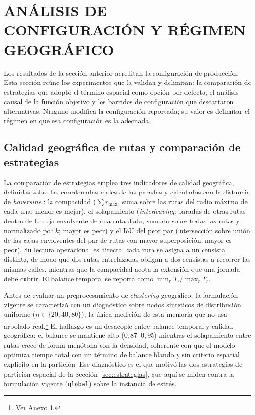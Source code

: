\section{ANÁLISIS DE CONFIGURACIÓN Y RÉGIMEN GEOGRÁFICO}
\label{sec:analisis-configuracion}

Los resultados de la sección anterior acreditan la configuración de producción. Esta sección
reúne los experimentos que la validan y delimitan: la comparación de estrategias que adoptó el
término espacial como opción por defecto, el análisis causal de la función objetivo y los barridos
de configuración que descartaron alternativas. Ninguno modifica la configuración reportada; su
valor es delimitar el régimen en que esa configuración es la adecuada.


\subsection{Calidad geográfica de rutas y comparación de estrategias}
\label{sec:comparacion-estrategias}

La comparación de estrategias emplea tres indicadores de calidad geográfica, definidos sobre las
coordenadas reales de las paradas y calculados con la distancia de \textit{haversine}
\citep{sinnott1984virtues}: la compacidad ($\sum r_{\max}$, suma sobre las rutas del radio máximo
de cada una; menor es mejor), el solapamiento (\textit{interleaving}: paradas de otras rutas dentro
de la caja envolvente de una ruta dada, sumado sobre todas las rutas y normalizado por $k$; mayor es
peor) y el IoU del peor par (intersección sobre unión de las cajas envolventes del par de rutas con
mayor superposición; mayor es peor). Su lectura operacional es directa: cada ruta se asigna a un
censista distinto, de modo que dos rutas entrelazadas obligan a dos censistas a recorrer las mismas
calles, mientras que la compacidad acota la extensión que una jornada debe cubrir. El balance
temporal se reporta como $\min_r T_r / \max_r T_r$.

Antes de evaluar un preprocesamiento de \textit{clustering} geográfico, la formulación vigente se
caracterizó con un diagnóstico sobre nodos sintéticos de distribución uniforme
($n \in \{20, 40, 80\}$), la única medición de esta memoria que no usa arbolado
real.\footnote{Ver \hyperref[anx:baseline-geo-sintetico]{Anexo 4}.} El hallazgo es un desacople
entre balance temporal y calidad geográfica: el balance se mantiene alto ($0{,}87$--$0{,}95$)
mientras el solapamiento entre rutas crece de forma monótona con la densidad, coherente con que el
modelo optimiza tiempo total con un término de balance blando y sin criterio espacial explícito en
la partición. Ese diagnóstico es el que motivó las dos estrategias de partición espacial de la
Sección~\ref{sec:estrategias}, que aquí se miden contra la formulación vigente (\texttt{global})
sobre la instancia de estrés.

